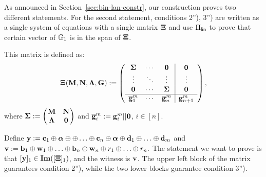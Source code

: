 As announced in Section~\ref{sec:bin-lan-constr}, our construction proves two different statements. For the second statement, conditions 2''), 3'') are written as a single system of equations with a single matrix $\mathbf{{\Xi}}$ and use $\Pi_{\mathsf{lin}}$ to prove that certain vector of $\mathbb{G}_1$ is in the span of $\mathbf{{\Xi}}$.

This matrix is defined as:
$$\mathbf{{\Xi}}(\mathbf{{M}},\mathbf{{N}},\mathbf{{\Lambda}},\mathbf{{G}}):=
\left(\begin{array}{ccc|ccc}
\mathbf{{\Sigma}}             & \cdots & \mathbf{{0}}                  & \mathbf{{0}} \\
\vdots                    & \ddots & \vdots                    & \vdots   \\
\mathbf{{0}}                  & \cdots & \mathbf{{\Sigma}}             & \mathbf{{0}} \\
\hline
\overline{\mathbf{g}}_1^{m} & \cdots & \overline{\mathbf{g}}_n^{m} & \mathbf{g}_{n+1}^{m}
\end{array}\right),
$$ where $\mathbf{{\Sigma}}:=\begin{pmatrix}
    \mathbf{{M}}       & \mathbf{{N}}\\
    \mathbf{{\Lambda}} & \mathbf{{0}}
\end{pmatrix}$ and
 $\overline{\mathbf{g}}_i^{m}:=\mathbf{g}_i^{m}||\mathbf{0}$, $i\in[n]$. 
 
Define $\mathbf{y}:=\mathbf{c}_1\oplus {\boldsymbol \alpha} \oplus
\oplus \ldots \oplus \mathbf{c}_n\oplus {\boldsymbol \alpha} 
\oplus \mathbf{d}_1 \oplus  \ldots \oplus  \mathbf{d}_m$
and 
 $\mathbf{v}:=\mathbf{b}_1\oplus \mathbf{w}_1 \oplus \ldots \oplus \mathbf{b}_n\oplus \mathbf{w}_n \oplus r_1 \oplus \ldots \oplus r_n.$ The statement we want to prove is that $[\mathbf{y}]_1 \in \mathbf{Im}([\mathbf{{\Xi}}]_1)$, and the witness is $\mathbf{v}$. The upper left block of the matrix guarantees condition 2''), while the two lower blocks guarantee 
condition 3'').

\iffull
\else

\fi
